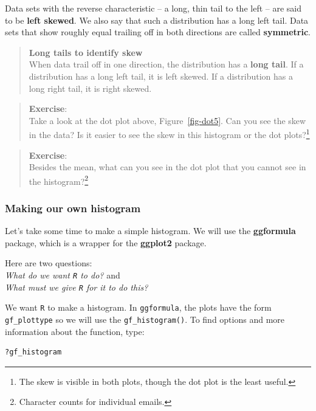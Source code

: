 \documentclass[
  letterpaper,
  DIV=11,
  numbers=noendperiod]{scrreprt}
\begin{document}
Data sets with the reverse characteristic -- a long, thin tail to the
left -- are said to be \textbf{left skewed}. We also say that such a
distribution has a long left tail. Data sets that show roughly equal
trailing off in both directions are called \textbf{symmetric}.

\begin{quote}
\textbf{Long tails to identify skew}\\
When data trail off in one direction, the distribution has a
\textbf{long tail}. If a distribution has a long left tail, it is left
skewed. If a distribution has a long right tail, it is right skewed.
\end{quote}

\begin{quote}
\textbf{Exercise}:\\
Take a look at the dot plot above, Figure~\ref{fig-dot5}. Can you see
the skew in the data? Is it easier to see the skew in this histogram or
the dot plots?\footnote{The skew is visible in both plots, though the
  dot plot is the least useful.}
\end{quote}

\begin{quote}
\textbf{Exercise}:\\
Besides the mean, what can you see in the dot plot that you cannot see
in the histogram?\footnote{Character counts for individual emails.}
\end{quote}

\subsubsection{Making our own histogram}\label{making-our-own-histogram}

Let's take some time to make a simple histogram. We will use the
\textbf{ggformula} package, which is a wrapper for the \textbf{ggplot2}
package.

Here are two questions:\\
\emph{What do we want \texttt{R} to do?} and\\
\emph{What must we give \texttt{R} for it to do this?}

We want \texttt{R} to make a histogram. In \texttt{ggformula}, the plots
have the form \texttt{gf\_plottype} so we will use the
\texttt{gf\_histogram()}. To find options and more information about the
function, type:

\begin{verbatim}
?gf_histogram
\end{verbatim}
\end{document}
